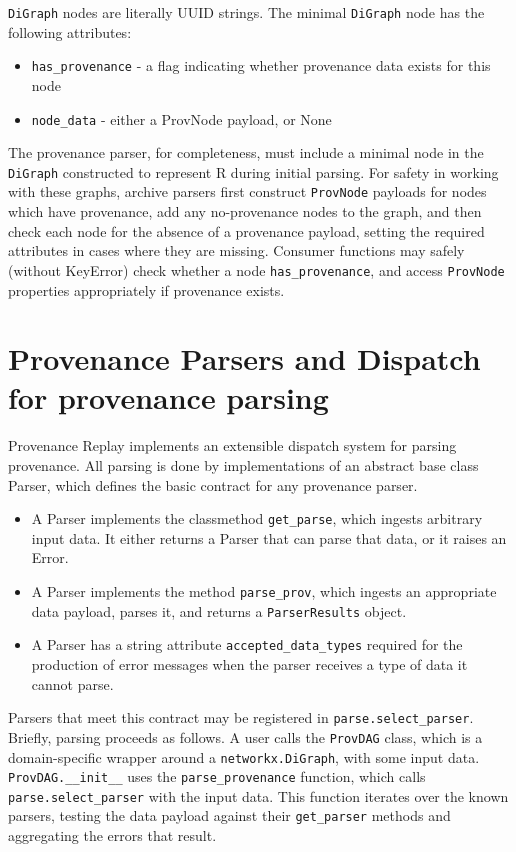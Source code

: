 \texttt{DiGraph} nodes are literally UUID strings. The minimal \texttt{DiGraph} node has the
following attributes:
\begin{itemize}
    \item \texttt{has\_provenance} - a flag indicating whether provenance data exists for this node
    \item \texttt{node\_data} - either a ProvNode payload, or None
\end{itemize}

The provenance parser, for completeness, must include a minimal node in the
\texttt{DiGraph} constructed to represent R during initial parsing. For safety in working
with these graphs, archive parsers first construct \texttt{ProvNode} payloads for nodes
which have provenance, add any no-provenance nodes to the graph, and then check
each node for the absence of a provenance payload, setting the required
attributes in cases where they are missing. Consumer functions may safely
(without KeyError) check whether a node \texttt{has\_provenance}, and access \texttt{ProvNode}
properties appropriately if provenance exists.

\section{Provenance Parsers and Dispatch for provenance parsing}

Provenance Replay implements an extensible dispatch system for parsing
provenance. All parsing is done by implementations of an abstract base class
Parser, which defines the basic contract for any provenance parser. 
\begin{itemize}
    \item A Parser implements the classmethod \texttt{get\_parse}, which ingests arbitrary input data. It either returns a Parser that can parse that data, or it raises an Error.
    \item A Parser implements the method \texttt{parse\_prov}, which ingests an appropriate data payload, parses it, and returns a \texttt{ParserResults} object.
    \item A Parser has a string attribute \texttt{accepted\_data\_types} required for the production of error messages when the parser receives a type of data it cannot parse.
\end{itemize}

Parsers that meet this contract may be registered in \texttt{parse.select\_parser}.
Briefly, parsing proceeds as follows. A user calls the \texttt{ProvDAG} class, which is a
domain-specific wrapper around a \texttt{networkx.DiGraph}, with some input data.
\texttt{ProvDAG.\_\_init\_\_} uses the \texttt{parse\_provenance} function, which calls
\texttt{parse.select\_parser} with the input data. This function iterates over the known
parsers, testing the data payload against their \texttt{get\_parser} methods and
aggregating the errors that result. 

